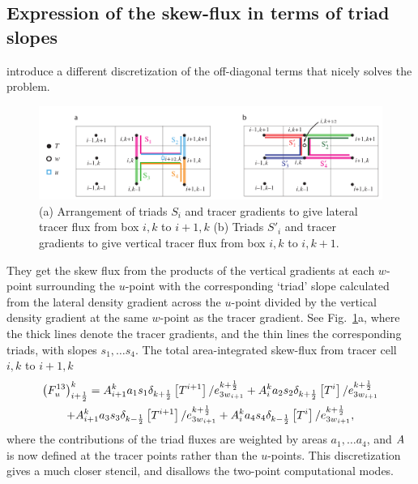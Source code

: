 \subsection{Expression of the skew-flux in terms of triad slopes}
\citep{Griffies_al_JPO98} introduce a different discretization of the
off-diagonal terms that nicely solves the problem.
\begin{figure}[h] \begin{center}
    \includegraphics[width=1.05\textwidth]{./TexFiles/Figures/Fig_GRIFF_triad_fluxes}
    \caption{ \label{fig:triad:ISO_triad}
      (a) Arrangement of triads $S_i$ and tracer gradients to
           give lateral tracer flux from box $i,k$ to $i+1,k$
      (b) Triads $S'_i$ and tracer gradients to give vertical tracer flux from
            box $i,k$ to $i,k+1$.}
 \end{center} \end{figure}
They get the skew flux from the products of the vertical gradients at
each $w$-point surrounding the $u$-point with the corresponding `triad'
slope calculated from the lateral density gradient across the $u$-point
divided by the vertical density gradient at the same $w$-point as the
tracer gradient. See Fig.~\ref{fig:triad:ISO_triad}a, where the thick lines
denote the tracer gradients, and the thin lines the corresponding
triads, with slopes $s_1, \dotsc s_4$. The total area-integrated
skew-flux from tracer cell $i,k$ to $i+1,k$
\begin{multline}
  \label{eq:triad:i13}
  \left( F_u^{13}  \right)_{i+\frac{1}{2}}^k = {A}_{i+1}^k a_1 s_1
  \delta _{k+\frac{1}{2}} \left[ T^{i+1}
  \right]/e_{{3w}_{i+1}}^{k+\frac{1}{2}}  + {A} _i^k a_2 s_2 \delta
  _{k+\frac{1}{2}} \left[ T^i
  \right]/e_{{3w}_{i+1}}^{k+\frac{1}{2}} \\
   +{A} _{i+1}^k a_3 s_3 \delta _{k-\frac{1}{2}} \left[ T^{i+1}
  \right]/e_{{3w}_{i+1}}^{k+\frac{1}{2}}  +{A} _i^k a_4 s_4 \delta
  _{k-\frac{1}{2}} \left[ T^i \right]/e_{{3w}_{i+1}}^{k+\frac{1}{2}},
\end{multline}
where the contributions of the triad fluxes are weighted by areas
$a_1, \dotsc a_4$, and ${A}$ is now defined at the tracer points
rather than the $u$-points. This discretization gives a much closer
stencil, and disallows the two-point computational modes.

